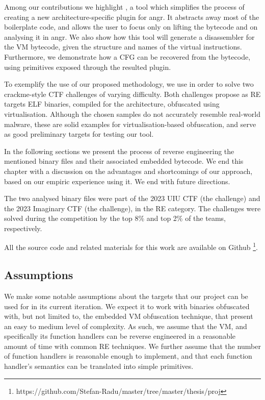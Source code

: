 Among our contributions we highlight , a tool which simplifies the process of creating a new architecture-specific plugin for angr. It abstracts away most of the boilerplate code, and allows the user to focus only on lifting the bytecode and on analysing it in angr. We also show how this tool will generate a disassembler for the \gls{VM} bytecode, given the structure and names of the virtual instructions. Furthermore, we demonstrate how a \gls{CFG} can be recovered from the bytecode, using primitives exposed through the resulted plugin.

To exemplify the use of our proposed methodology, we use  in order to solve two crackme-style \gls{CTF} challenges of varying difficulty. Both challenges propose as \gls{RE} targets \gls{ELF} binaries, compiled for the  architecture, obfuscated using virtualisation. Although the chosen samples do not accurately resemble real-world malware, these are solid examples for virtualisation-based obfuscation, and serve as good preliminary targets for testing our tool.

In the following sections we present the process of reverse engineering the mentioned binary files and their associated embedded bytecode. We end this chapter with a discussion on the advantages and shortcomings of our approach, based on our empiric experience using it. We end with future directions.

The two analysed binary files were part of the 2023 UIU CTF (the  challenge) \cite{uiu2023} and the 2023 Imaginary CTF \cite{ictf2023} (the  challenge), in the \gls{RE} category. The challenges were solved during the competition by the top 8\% and top 2\% of the teams, respectively.

All the source code and related materials for this work are available on Github \footnote{https://github.com/Stefan-Radu/master/tree/master/thesis/proj}.

\subsection{Assumptions}

We make some notable assumptions about the targets that our project can be used for in its current iteration. We expect it to work with binaries obfuscated with, but not limited to, the embedded \gls{VM} obfuscation technique, that present an easy to medium level of complexity. As such, we assume that the \gls{VM}, and specifically its function handlers can be reverse engineered in a reasonable amount of time with common \gls{RE} techniques. We further assume that the number of function handlers is reasonable enough to implement, and that each function handler's semantics can be translated into simple primitives.

